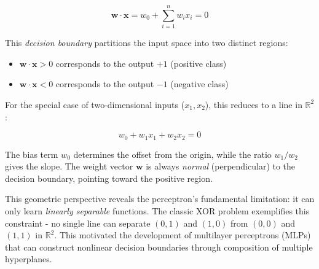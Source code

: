 \documentclass{tufte-handout}
\begin{document}
\begin{equation}
    \mathbf{w} \cdot \mathbf{x} = w_0 + \sum_{i=1}^n w_i x_i = 0
\end{equation}

This \textit{decision boundary} partitions the input space into two distinct regions:

\begin{itemize}
    \item $\mathbf{w} \cdot \mathbf{x} > 0$ corresponds to the output $+1$ (positive class)
    \item $\mathbf{w} \cdot \mathbf{x} < 0$ corresponds to the output $-1$ (negative class)
\end{itemize}

For the special case of two-dimensional inputs ($x_1, x_2$), this reduces to a line in $\mathbb{R}^2$:

\begin{equation}
    w_0 + w_1x_1 + w_2x_2 = 0
\end{equation}

The bias term $w_0$ determines the offset from the origin, while the ratio $w_1/w_2$ gives the slope. The weight vector $\mathbf{w}$ is always \textit{normal} (perpendicular) to the decision boundary, pointing toward the positive region.

\begin{marginfigure}
\centering
\end{marginfigure}

This geometric perspective reveals the perceptron's fundamental limitation: it can only learn \textit{linearly separable} functions. The classic XOR problem exemplifies this constraint - no single line can separate $(0,1)$ and $(1,0)$ from $(0,0)$ and $(1,1)$ in $\mathbb{R}^2$. This motivated the development of multilayer perceptrons (MLPs) that can construct nonlinear decision boundaries through composition of multiple hyperplanes.
\end{document}
